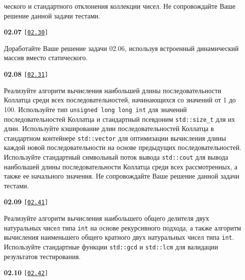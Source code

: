 \documentclass[a4paper,12pt]{article}
\begin{document}
ческого и стандартного отклонения коллекции чисел. Не сопровождайте Ваше решение данной задачи тестами.

\bigskip

{\large \textbf{02.07} \texttt{[\href{https://github.com/i-s-m-mipt/Education/blob/master/projects/examples/source/02.30.cpp}{\texttt{02.30}}]}}

\bigskip

Доработайте Ваше решение задачи 02.06, используя встроенный динамический массив вместо статического.

\bigskip

{\large \textbf{02.08} \texttt{[\href{https://github.com/i-s-m-mipt/Education/blob/master/projects/examples/source/02.31.cpp}{\texttt{02.31}}]}}

\bigskip

Реализуйте алгоритм вычисления наибольшей длины последовательности Коллатца среди всех последовательностей, начинающихся со значений от 1 до 100. Используйте тип \lstinline{unsigned long long int} для значений последовательностей Коллатца и стандартный псевдоним \lstinline{std::size_t} для их длин. Используйте кэширование длин последовательностей Коллатца в стандартном контейнере \lstinline{std::vector} для оптимизации вычисления длины каждой новой последовательности на основе предыдущих последовательностей. Используйте стандартный символьный поток вывода \lstinline{std::cout} для вывода наибольшей длины последовательности Коллатца среди всех рассмотренных, а также ее начального значения. Не сопровождайте Ваше решение данной задачи тестами.

\bigskip

{\large \textbf{02.09} \texttt{[\href{https://github.com/i-s-m-mipt/Education/blob/master/projects/examples/source/02.41.cpp}{\texttt{02.41}}]}}

\bigskip

Реализуйте алгоритм вычисления наибольшего общего делителя двух натуральных чисел типа \lstinline{int} на основе рекурсивного подхода, а также алгоритм вычисления наименьшего общего кратного двух натуральных чисел типа \lstinline{int}. Используйте стандартные функции \lstinline{std::gcd} и \lstinline{std::lcm} для валидации результатов тестирования.

\bigskip

{\large \textbf{02.10} \texttt{[\href{https://github.com/i-s-m-mipt/Education/blob/master/projects/examples/source/02.42.cpp}{\texttt{02.42}}]}}

\bigskip
\end{document}

